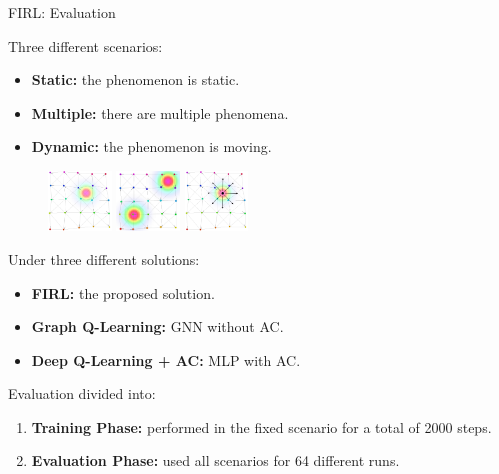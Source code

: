 \documentclass[presentation, 8pt,169]{beamer}\mode<presentation>{\usetheme{AMSBolognaFC}}
\begin{document}
\begin{frame}{FIRL: Evaluation}

    Three different scenarios:
    \begin{itemize}
      \item \textbf{Static:} the phenomenon is static.
      \item \textbf{Multiple:} there are multiple phenomena.
      \item \textbf{Dynamic:} the phenomenon is moving.
    \end{itemize}
    \begin{figure}
        \centering
        \includegraphics[width=0.15\textwidth]{img/base}
        \includegraphics[width=0.15\textwidth]{img/two}
        \includegraphics[width=0.15\textwidth]{img/moving}
    \end{figure}

    Under three different solutions:
    \begin{itemize}
      \item \textbf{FIRL:} the proposed solution.
      \item \textbf{Graph Q-Learning:} GNN without AC.
      \item \textbf{Deep Q-Learning + AC:} MLP with AC.
    \end{itemize}

Evaluation divided into:
  \begin{enumerate}
    \item \textbf{Training Phase:} performed in the fixed scenario for a total of 2000 steps.
    \item \textbf{Evaluation Phase:} used all scenarios for 64 different runs.
  \end{enumerate}
\end{frame}
\end{document}
